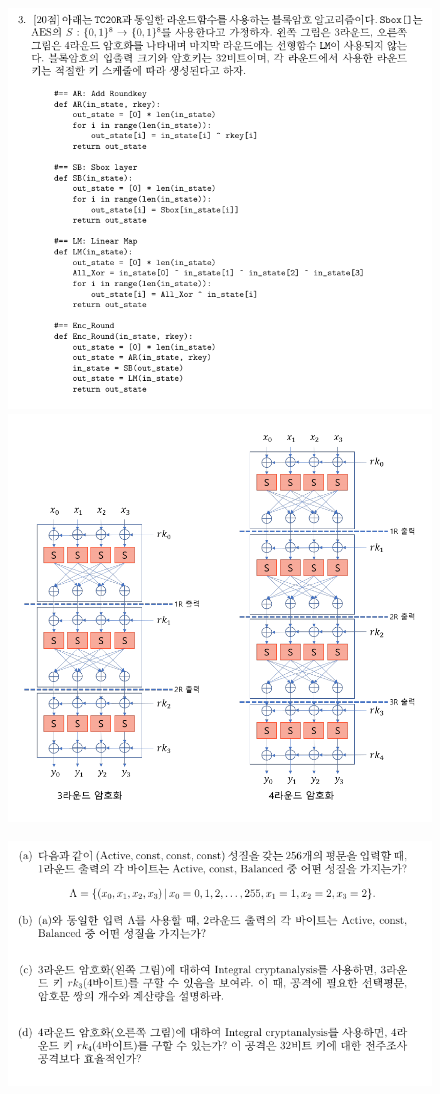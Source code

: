\begin{enumerate}[\bf 1.]
\begin{figure}[h!]
		\includegraphics[scale=.5]{final2023-3}
		\includegraphics[scale=.375]{final2023-3-2}
	\end{figure}
	\begin{figure}[h!]\centering
		\includegraphics[scale=.55]{final2023-3-3}

\end{figure}
\end{enumerate}
